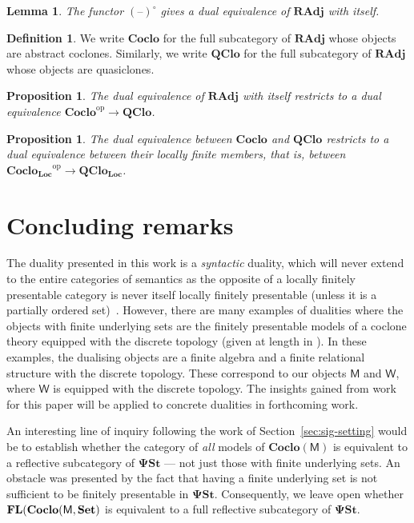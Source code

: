 \documentclass[11pt, a4paper, twoside,leqno]{amsart}
\newcommand{\cat}[1]{\mathbf{#1}}
\newcommand{\thg}{{\mathord{\text{--}}}}
\numberwithin{equation}{section}
\theoremstyle{plain}
\newtheorem{Prop}[Thm]{Proposition}
\newtheorem{Lemma}[Thm]{Lemma}
\theoremstyle{definition}
\newtheorem{Defn}[Thm]{Definition}
\newcommand{\Set}{\cat{Set}}
\DeclareMathOperator{\FL}{\bf FL}
\begin{document}
\begin{Lemma}
  \label{lem:12}
  The functor \((\thg)^{\circ}\) gives a dual equivalence of \(\cat{RAdj}\) with itself.
\end{Lemma}

\begin{Defn}
  \label{def:subcats-radj}
  We write \(\cat{Coclo}\) for the full subcategory of \(\cat{RAdj}\)
  whose objects are abstract coclones. Similarly, we write
  \(\cat{QClo}\) for the full subcategory of \(\cat{RAdj}\)
  whose objects are quasiclones.
\end{Defn}

\begin{Prop}
  \label{prop:2}
  The dual equivalence of \(\cat{RAdj}\) with itself restricts to a dual
  equivalence \(\cat{Coclo}^{\mathrm{op}} \rightarrow
  \cat{QClo}\).
\end{Prop}

\begin{Prop}
  \label{prop:4}
  The dual equivalence between \(\cat{Coclo}\) and \(\cat{QClo}\) restricts to a dual
  equivalence between their locally finite members, that is, between \(\cat{Coclo_{Loc}}^{\mathrm{op}} \rightarrow \cat{QClo_{Loc}}\).
\end{Prop}

\section{Concluding remarks}
\label{sec:concluding-remarks}

The duality presented in this work is a \emph{syntactic} duality,
which will never extend to the entire categories of semantics as the opposite of
a locally finitely presentable category is never itself locally
finitely presentable (unless it is a partially ordered
set)~\cite{Gabriel:1971aa}. However, there are many examples of dualities where the objects with finite underlying
sets are the finitely presentable models of a coclone
theory equipped with the discrete topology (given at length in \cite{Clark:1998aa}). In these examples, the
dualising objects are a finite algebra and a finite relational
structure with the discrete topology. These correspond to our objects
\(\mathsf{M}\) and \(\mathsf{W}\), where \(\mathsf{W}\) is equipped
with the discrete topology.
The insights
gained from work for this paper will be applied to concrete dualities in forthcoming work.

An interesting line of inquiry following the work of Section~\ref{sec:sig-setting}
would be to establish whether the category of
\emph{all} models of \(\cat{Coclo}(\mathsf{M})\) is equivalent to a reflective
subcategory of \(\cat{\Psi St}\) --- not just those with finite
underlying sets. An obstacle was presented by the fact
that having a finite underlying set is not sufficient to be finitely
presentable in \(\cat{\Psi St}\). Consequently, we leave open whether
\(\FL(\cat{Coclo}(\mathsf{M},\Set)\) is equivalent to a full
reflective subcategory of \(\cat{\Psi St}\).
\end{document}
